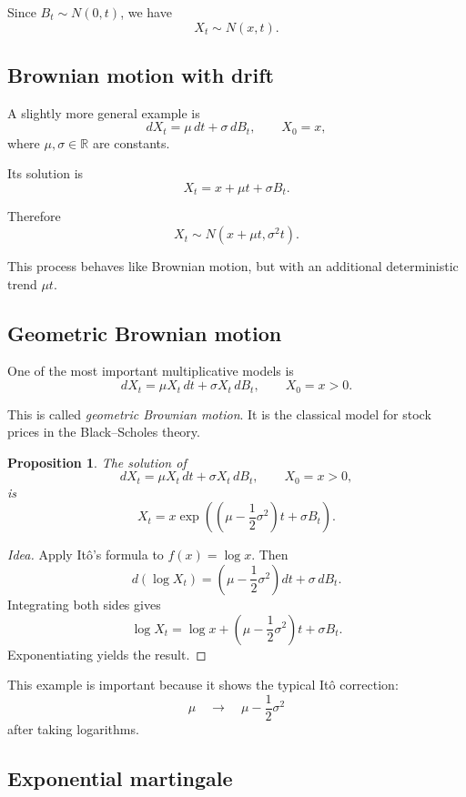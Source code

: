 \documentclass[11pt]{article}
\newtheorem{proposition}[theorem]{Proposition}
\theoremstyle{definition}
\begin{document}
\medskip

\noindent
Since \(B_t\sim N(0,t)\), we have
\[
X_t \sim N(x,t).
\]

\subsection{Brownian motion with drift}

A slightly more general example is
\[
dX_t = \mu\,dt + \sigma\,dB_t,
\qquad X_0=x,
\]
where \(\mu,\sigma\in\mathbb R\) are constants.

Its solution is
\[
X_t = x + \mu t + \sigma B_t.
\]

Therefore
\[
X_t \sim N(x+\mu t,\sigma^2 t).
\]

\medskip

\noindent
This process behaves like Brownian motion, but with an additional deterministic trend \(\mu t\).

\subsection{Geometric Brownian motion}

One of the most important multiplicative models is
\[
dX_t = \mu X_t\,dt + \sigma X_t\,dB_t,
\qquad X_0=x>0.
\]

This is called \emph{geometric Brownian motion}. It is the classical model for stock prices in the Black--Scholes theory.

\begin{proposition}
The solution of
\[
dX_t = \mu X_t\,dt + \sigma X_t\,dB_t,
\qquad X_0=x>0,
\]
is
\[
X_t
=
x\exp\!\left(
\left(\mu-\frac12\sigma^2\right)t+\sigma B_t
\right).
\]
\end{proposition}

\begin{proof}[Idea]
Apply It\^o's formula to \(f(x)=\log x\). Then
\[
d(\log X_t)
=
\left(\mu-\frac12\sigma^2\right)dt+\sigma\,dB_t.
\]
Integrating both sides gives
\[
\log X_t
=
\log x+\left(\mu-\frac12\sigma^2\right)t+\sigma B_t.
\]
Exponentiating yields the result.
\end{proof}

\medskip

\noindent
This example is important because it shows the typical It\^o correction:
\[
\mu \quad \longrightarrow \quad \mu-\frac12\sigma^2
\]
after taking logarithms.

\subsection{Exponential martingale}
\end{document}
